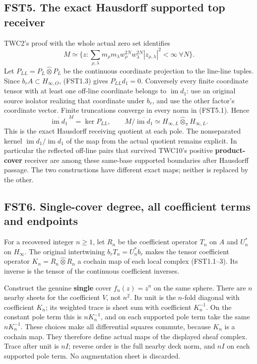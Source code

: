 \subsection{FST5. The exact Hausdorff supported top
receiver}\label{fst5.-the-exact-hausdorff-supported-top-receiver}

TWC2's proof with the whole actual zero set identifies \[
M\simeq\{z:\sum_{\rho,\lambda}m_\rho m_\lambda
 w_\rho^{2N}w_\lambda^{2N}|z_{\rho,\lambda}|^2<\infty\ \forall N\}.
\tag{FST5.1}
\] Let \(P_{LL}=P_L\widehat\otimes P_L\) be the continuous coordinate
projection to the line-line tuples. Since \(b_rA\subset H_{\infty,O}\),
(FST1.3) gives \(P_{LL}d_1=0\). Conversely every finite coordinate
tensor with at least one off-line coordinate belongs to
\(\operatorname{im}d_1\): use an original source isolator realizing that
coordinate under \(b_r\), and use the other factor's coordinate vector.
Finite truncations converge in every norm in (FST5.1). Hence \[
\boxed{\quad\overline{\operatorname{im}d_1}^{\,M}=\ker P_{LL},
\qquad M/\overline{\operatorname{im}d_1}\simeq
H_{\infty,L}\widehat\otimes_\pi H_{\infty,L}.\quad}
\tag{FST5.2}
\] This is the exact Hausdorff receiving quotient at each pole. The
nonseparated kernel
\(\overline{\operatorname{im}d_1}/\operatorname{im}d_1\) of the map from
the actual quotient remains explicit. In particular the reflected
off-line pairs that survived TWC10's positive \textbf{product-cover}
receiver are among these same-base supported boundaries after Hausdorff
passage. The two constructions have different exact maps; neither is
replaced by the other.

\subsection{FST6. Single-cover degree, all coefficient terms and
endpoints}\label{fst6.-single-cover-degree-all-coefficient-terms-and-endpoints}

For a recovered integer \(n\ge1\), let \(R_n\) be the coefficient
operator \(T_n\) on \(A\) and \(U_n^*\) on \(H_\infty\). The original
intertwining \(b_rT_n=U_n^*b_r\) makes the tensor coefficient operator
\(K_n=R_n\widehat\otimes R_n\) a cochain map of each local complex
(FST1.1--3). Its inverse is the tensor of the continuous coefficient
inverses.

Construct the genuine \textbf{single} cover \(f_n(z)=z^n\) on the same
sphere. There are \(n\) nearby sheets for the coefficient \(V\), not
\(n^2\). Its unit is the \(n\)-fold diagonal with coefficient \(K_n\);
its weighted trace is sheet sum with coefficient \(K_n^{-1}\). On the
constant pole term this is \(nK_n^{-1}\), and on each supported pole
term take the same \(nK_n^{-1}\). These choices make all differential
squares commute, because \(K_n\) is a cochain map. They therefore define
actual maps of the displayed sheaf complex. Trace after unit is \(nI\);
reverse order is the full nearby deck norm, and \(nI\) on each supported
pole term. No augmentation sheet is discarded.

